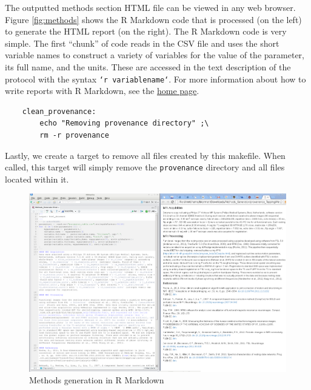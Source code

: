 The outputted methods section HTML file can be viewed in any web browser. Figure \autoref{fig:methods} shows the R Markdown code that is processed (on the left) to generate the HTML report (on the right). The R Markdown code is very simple. The first ``chunk'' of code reads in the CSV file and uses the short variable names to construct a variety of variables for the value of the parameter, its full name, and the units. These are accessed in the text description of the protocol with the syntax \texttt{`r variablename`}. For more information about how to write reports with R Markdown, see the \href{http://rmarkdown.rstudio.com}{home page}. 

\begin{lstlisting}
	clean_provenance:
		echo "Removing provenance directory" ;\
		rm -r provenance
\end{lstlisting}

Lastly, we create a target to remove all files created by this makefile. When called, this target will simply remove the \texttt{provenance} directory and all files located within it.



\begin{figure}
	\begin{center}
		\includegraphics[scale=.6]{images/MethodsGenerator.png}
		\caption{Methods generation in R Markdown}
                \label{fig:methods}
	\end{center}
\end{figure}